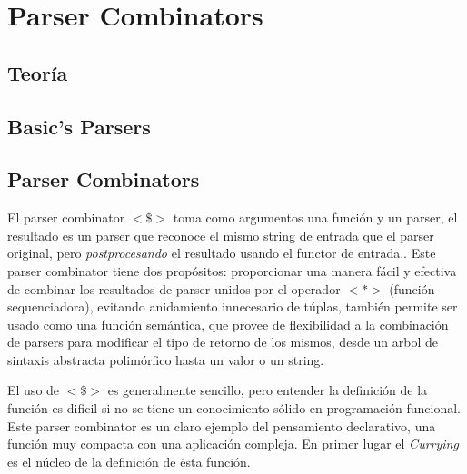 
\chapter{Parser Combinators}



\section{Teoría}

\section{Basic's Parsers}

\section{Parser Combinators}

El parser combinator $<\$>$ toma como argumentos una función y un parser, el resultado es un parser que reconoce el mismo string de entrada que el parser original, pero \emph{postprocesando} el resultado usando el functor de entrada.\cite{Jeuring2010}. Este parser combinator tiene dos propósitos: proporcionar una manera fácil y efectiva de combinar los resultados de parser unidos por el operador $<*>$ (función sequenciadora), evitando anidamiento innecesario de túplas, también permite ser usado como una función semántica, que provee de flexibilidad a la combinación de parsers para modificar el tipo de retorno de los mismos, desde un arbol de sintaxis abstracta polimórfico hasta un valor o un string. 

El uso de $<\$>$ es generalmente sencillo, pero entender la definición de la función es dificil si no se tiene un conocimiento sólido en programación funcional. Este parser combinator es un claro ejemplo del pensamiento declarativo, una función muy compacta con una aplicación compleja. En primer lugar el \emph{Currying} es el núcleo de la definición de ésta función.

